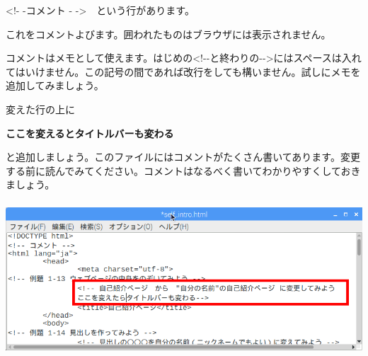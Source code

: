 \documentclass[a4paper,12pt]{jarticle}
\begin{document}
\bigskip

{\textless}!- -コメント -
-{\textgreater}　という行があります。

これをコメントよびます。囲われたものはブラウザには表示されません。

コメントはメモとして使えます。はじめの{\textless}!-{}-と終わりの{}-{}-{\textgreater}にはスペースは入れてはいけません。この記号の間であれば改行をしても構いません。試しにメモを追加してみましょう。

変えた行の上に

\textbf{ここを変えるとタイトルバーも変わる
}

と追加しましょう。このファイルにはコメントがたくさん書いてあります。変更する前に読んでみてください。コメントはなるべく書いてわかりやすくしておきましょう。


\centering
\includegraphics[width=14.42cm,height=5.768cm]{textbook-img150.png}
\end{document}
